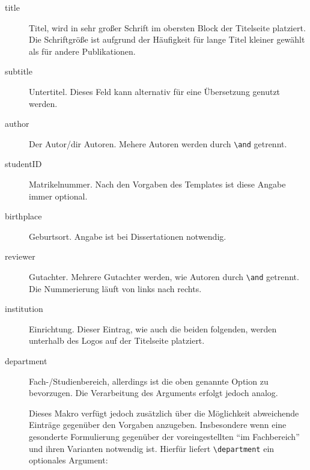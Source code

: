\documentclass[
	ngerman,
	ruledheaders=section,%
	class=report,%
	thesis={type=bachelor},%
	accentcolor=9c,%
	custommargins=true,%
	marginpar=false,%
	parskip=half-,%
	fontsize=11pt,%
]{tudapub}
\let\code\texttt
\begin{document}
\begin{description}
	\item[title] Titel, wird in sehr großer Schrift im obersten Block der Titelseite platziert. Die Schriftgröße ist aufgrund der Häufigkeit für lange Titel kleiner gewählt als für andere Publikationen.
	\item[subtitle] Untertitel. Dieses Feld kann alternativ für eine Übersetzung genutzt werden.
	\item[author] Der Autor/dir Autoren. Mehere Autoren werden durch \verb+\and+ getrennt.
	\item[studentID] Matrikelnummer. Nach den Vorgaben des Templates ist diese Angabe immer optional.
	\item[birthplace] Geburtsort. Angabe ist bei Dissertationen notwendig.
	\item[reviewer] Gutachter. Mehrere Gutachter werden, wie Autoren durch \verb+\and+ getrennt. Die Nummerierung läuft von links nach rechts.
	\item[institution] Einrichtung. Dieser Eintrag, wie auch die beiden folgenden, werden unterhalb des Logos auf der Titelseite platziert.
	\item[department] Fach-/Studienbereich, allerdings ist die oben genannte Option zu bevorzugen. Die Verarbeitung des Arguments erfolgt jedoch analog.

	Dieses Makro verfügt jedoch zusätzlich über die Möglichkeit abweichende Einträge gegenüber den Vorgaben anzugeben. Insbesondere wenn eine gesonderte Formulierung gegenüber der voreingestellten \enquote{im Fachbereich} und ihren Varianten notwendig ist. Hierfür liefert \code{\textbackslash{}department} ein optionales Argument:


\end{description}
\end{document}
